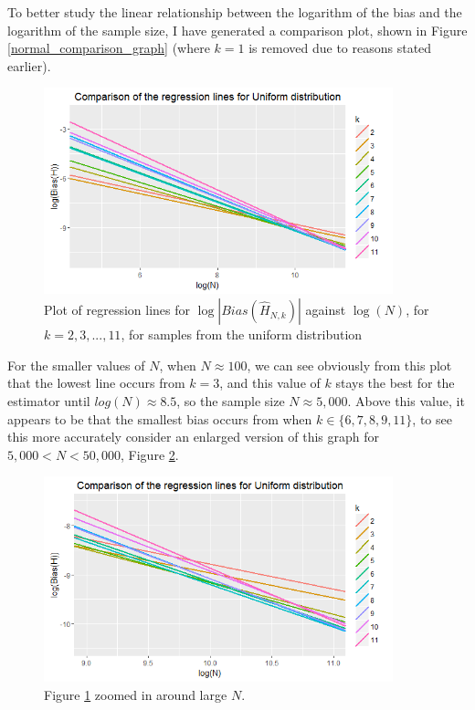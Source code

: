 \documentclass[12pt]{report}
\begin{document}
To better study the linear relationship between the logarithm of the bias and the logarithm of the sample size, I have generated a comparison plot, shown in Figure \ref{normal_comparison_graph} (where $k=1$ is removed due to reasons stated earlier).

\begin{figure}
  \begin{center}
    \includegraphics[width=0.9\textwidth]{./Graphs/Best/UniformComparison.png}
  \end{center}
\caption{Plot of regression lines for $\log|Bias(\hat{H}_{N, k})|$ against $\log(N)$, for $k=2, 3,..., 11$, for samples from the uniform distribution}
  \label{uniform_comparison_graph}
\end{figure}

For the smaller values of $N$, when $N \approx 100$, we can see obviously from this plot that the lowest line occurs from $k=3$, and this value of $k$ stays the best for the estimator until $log(N) \approx 8.5$, so the sample size $N \approx 5,000$. Above this value, it appears to be that the smallest bias occurs from when $k \in \{6, 7, 8, 9, 11\}$, to see this more accurately consider an enlarged version of this graph for $5,000 < N < 50,000$, Figure \ref{uniform_comparison_graph_zoom}.

\begin{figure}
  \begin{center}
    \includegraphics[width=0.9\textwidth]{./Graphs/Best/UniformComparisonZoom.png}
  \end{center}
\caption{Figure \ref{uniform_comparison_graph} zoomed in around large $N$.}
  \label{uniform_comparison_graph_zoom}
\end{figure}
\end{document}
